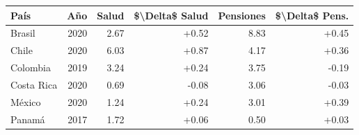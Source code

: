 
\begin{tabular}{lrrrrr}
\toprule
País & Año & Salud & \$\textbackslash{}Delta\$ Salud & Pensiones & \$\textbackslash{}Delta\$ Pens.\\
\midrule
Brasil & 2020 & 2.67 & +0.52 & 8.83 & +0.45\\
Chile & 2020 & 6.03 & +0.87 & 4.17 & +0.36\\
Colombia & 2019 & 3.24 & +0.24 & 3.75 & -0.19\\
Costa Rica & 2020 & 0.69 & -0.08 & 3.06 & -0.03\\
México & 2020 & 1.24 & +0.24 & 3.01 & +0.39\\
Panamá & 2017 & 1.72 & +0.06 & 0.50 & +0.03\\
\bottomrule
\end{tabular}